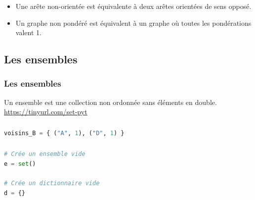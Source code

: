 \documentclass[svgnames,11pt]{beamer}
\begin{document}
\begin{frame}
    \frametitle{}

    \begin{itemize}
        \item Une arête non-orientée est équivalente à deux arêtes orientées de sens opposé.
        \item Un graphe non pondéré est équivalent à un graphe où toutes les pondérations valent 1.
    \end{itemize}

\end{frame}
\subsection{Les ensembles}
\begin{frame}
    \frametitle{Les ensembles}
\begin{aretenir}[]
    Un ensemble est une collection non ordonnée sans éléments en double. \url{https://tinyurl.com/set-pyt}
\end{aretenir}
    

\end{frame}
\begin{frame}[fragile]
    \frametitle{}

    \begin{center}
    \end{center}
    \begin{center}
    \begin{lstlisting}[language=Python , basicstyle=\ttfamily\small, xleftmargin=2em, xrightmargin=2em]
voisins_B = { ("A", 1), ("D", 1) }
\end{lstlisting}
    \label{CODE}
    \end{center}
\end{frame}
\begin{frame}[fragile]
    \frametitle{}

    
\begin{aretenir}[Remarque]
\begin{center}
\begin{lstlisting}[language=Python , basicstyle=\ttfamily\small, xleftmargin=2em, xrightmargin=2em]
# Crée un ensemble vide
e = set()

# Crée un dictionnaire vide
d = {}
\end{lstlisting}
\end{center}
\end{aretenir}

\end{frame}
\end{document}

